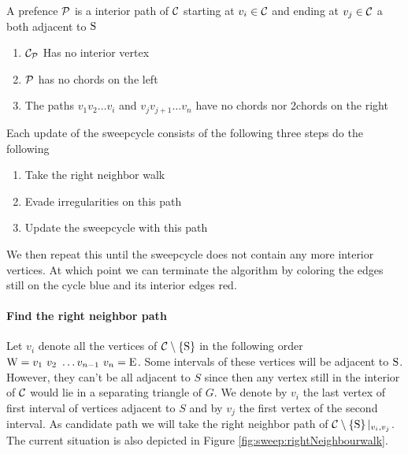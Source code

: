   \begin{defi}[Prefence]
    A prefence $\P$ is a interior path of $\C$ starting at $v_i \in \C$ and ending at $v_j \in \C$ a both adjacent to $\pS$
    \begin{enumerate}
      \itemsep=-4pt
      \renewcommand*{\labelenumi}{(P\arabic{enumi})}%
      \renewcommand*{\theenumi}{(P\arabic{enumi})}%

      \item  $\C_\P$ Has no interior vertex
      \label{p:noInteriorVertex}
      \item  $\P$ has no chords on the left     \label{p:Wchordfree}
      \item  The paths $v_1 v_2 \ldots v_i$ and $v_j v_{j+1} \ldots v_n$ have no chords nor 2chords on the right     \label{p:Cchordfree}
    \end{enumerate}
  \end{defi}

  Each update of the sweepcycle consists of the following three steps do the following
  \begin{enumerate}
    \itemsep=-4pt
    \item Take the right neighbor walk
    \item Evade irregularities on this path
    \item Update the sweepcycle with this path
  \end{enumerate}

  We then repeat this until the sweepcycle does not contain any more interior vertices. At which point we can terminate the algorithm by coloring the edges still on the cycle blue and its interior edges red.

  \paragraph{Find the right neighbor path}
    Let $v_i$ denote all the vertices of $\cpath$ in the following order $\pW =  v_1 \  v_2 \  \ldots v_{n-1} \  v_n = \pE$.
    Some intervals of these vertices will be adjacent to $\pS$. However, they can't be all adjacent to $S$ since then any vertex still in the interior of $\C$ would lie in a separating triangle of $G$. We denote by $v_i$ the last vertex of first interval of vertices adjacent to $S$ and by $v_j$ the first vertex of the second interval.
    As candidate path we will take the right neighbor path of $\cpath|_{v_i, v_j}$.
    The current situation is also depicted in Figure \ref{fig:sweep:rightNeighbourwalk}.

